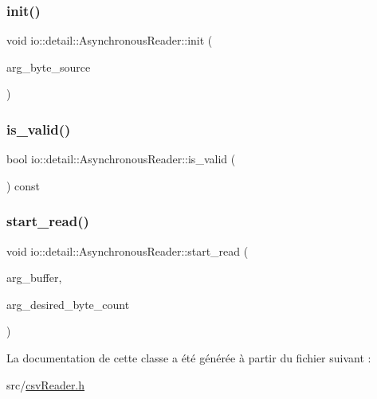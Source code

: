 \subsubsection{\texorpdfstring{init()}{init()}}
{\footnotesize\ttfamily void io\+::detail\+::\+Asynchronous\+Reader\+::init (\begin{DoxyParamCaption}\item[{std\+::unique\+\_\+ptr$<$ \hyperlink{classio_1_1ByteSourceBase}{Byte\+Source\+Base} $>$}]{arg\+\_\+byte\+\_\+source }\end{DoxyParamCaption})\hspace{0.3cm}{\ttfamily [inline]}}

\mbox{\label{classio_1_1detail_1_1AsynchronousReader_ab6b6f8483008208fc3f529f94c7125e2}} 
\subsubsection{\texorpdfstring{is\+\_\+valid()}{is\_valid()}}
{\footnotesize\ttfamily bool io\+::detail\+::\+Asynchronous\+Reader\+::is\+\_\+valid (\begin{DoxyParamCaption}{ }\end{DoxyParamCaption}) const\hspace{0.3cm}{\ttfamily [inline]}}

\mbox{\label{classio_1_1detail_1_1AsynchronousReader_a9818851dbb994042d0d84183220e71c6}} 
\subsubsection{\texorpdfstring{start\+\_\+read()}{start\_read()}}
{\footnotesize\ttfamily void io\+::detail\+::\+Asynchronous\+Reader\+::start\+\_\+read (\begin{DoxyParamCaption}\item[{char $\ast$}]{arg\+\_\+buffer,  }\item[{int}]{arg\+\_\+desired\+\_\+byte\+\_\+count }\end{DoxyParamCaption})\hspace{0.3cm}{\ttfamily [inline]}}



La documentation de cette classe a été générée à partir du fichier suivant \+:\begin{DoxyCompactItemize}
\item 
src/\hyperlink{csvReader_8h}{csv\+Reader.\+h}\end{DoxyCompactItemize}
